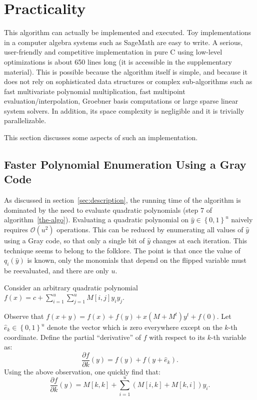 \documentclass[a4paper,UKenglish,cleveref, autoref]{lipics-v2019}
\newcommand{\bits}{\left\{0, 1\right\}}
\newcommand{\bigO}[1]{\ensuremath{\mathcal{O}\left( #1 \right)} }
\begin{document}
\section{Practicality}

This algorithm can actually be implemented and executed. Toy implementations in
a computer algebra systems such as \textsf{SageMath} are easy to write. A
serious, user-friendly and competitive implementation in pure C using low-level
optimizations is about 650 lines long (it is accessible in the supplementary
material). This is possible because the algorithm itself is simple, and because
it does not rely on sophisticated data structures or complex sub-algorithms such
as fast multivariate polynomial multiplication, fast multipoint
evaluation/interpolation, Groebner basis computations or large sparse linear
system solvers. In addition, its space complexity is negligible and it is
trivially parallelizable.

This section discusses some aspects of such an implementation.

\subsection{Faster Polynomial Enumeration Using a Gray Code}

As discussed in section~\ref{sec:description}, the running time of the algorithm
is dominated by the need to evaluate quadratic polynomials (step 7 of
algorithm~\ref{the-algo}). Evaluating a quadratic polynomial on
$\hat y \in \bits^u$ naively requires $\bigO{u^2}$ operations. This can be
reduced by enumerating all values of $\hat y$ using a Gray code, so that only a
single bit of $\hat y$ changes at each iteration. This technique seems to belong
to the folklore. The point is that once the value of $q_i(\hat y)$ is known,
only the monomials that depend on the flipped variable must be reevaluated, and
there are only $u$.

Consider an arbitrary quadratic polynomial $\displaystyle f(x) = c + \sum_{i=1}^u \sum_{j=1}^u M[i,j] y_i y_j$.

Observe that $f(x + y) = f(x) + f(y) + x \left(M + M^t\right)y^t + f(0)$. Let
$\hat e_k \in \bits^u$ denote the vector which is zero everywhere except on the
$k$-th coordinate.  Define the partial ``derivative'' of $f$ with respect to its
$k$-th variable as:
\[
  \frac{\partial f}{\partial k}(y) = f(y) + f(y + \hat e_k).
\]
Using the above observation, one quickly find that:
\[
  \frac{\partial f}{\partial k}(y) = M[k,k] + \sum_{i=1}^u (M[i,k] + M[k, i]) y_i.
\]
\end{document}
